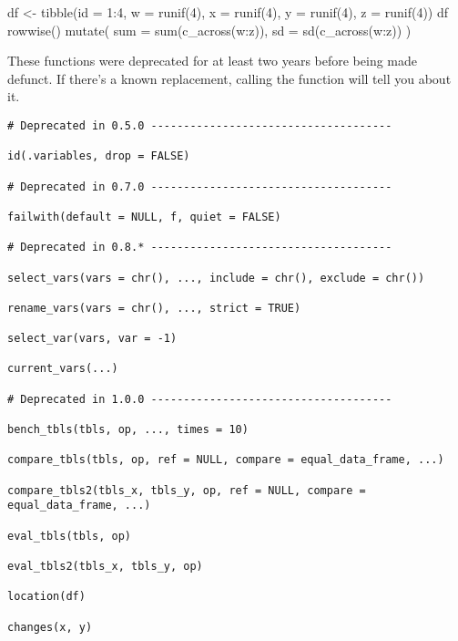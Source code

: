 \documentclass[a4paper]{book}
\begin{document}
%
\begin{Examples}
\begin{ExampleCode}
df <- tibble(id = 1:4, w = runif(4), x = runif(4), y = runif(4), z = runif(4))
df %
  rowwise() %
  mutate(
    sum = sum(c_across(w:z)),
    sd = sd(c_across(w:z))
  )
\end{ExampleCode}
\end{Examples}
%
\begin{Description}
\strong{[Defunct]}

These functions were deprecated for at least two years before being
made defunct. If there's a known replacement, calling the function
will tell you about it.
\end{Description}
%
\begin{Usage}
\begin{verbatim}
# Deprecated in 0.5.0 -------------------------------------

id(.variables, drop = FALSE)

# Deprecated in 0.7.0 -------------------------------------

failwith(default = NULL, f, quiet = FALSE)

# Deprecated in 0.8.* -------------------------------------

select_vars(vars = chr(), ..., include = chr(), exclude = chr())

rename_vars(vars = chr(), ..., strict = TRUE)

select_var(vars, var = -1)

current_vars(...)

# Deprecated in 1.0.0 -------------------------------------

bench_tbls(tbls, op, ..., times = 10)

compare_tbls(tbls, op, ref = NULL, compare = equal_data_frame, ...)

compare_tbls2(tbls_x, tbls_y, op, ref = NULL, compare = equal_data_frame, ...)

eval_tbls(tbls, op)

eval_tbls2(tbls_x, tbls_y, op)

location(df)

changes(x, y)
\end{verbatim}
\end{Usage}
\end{document}
